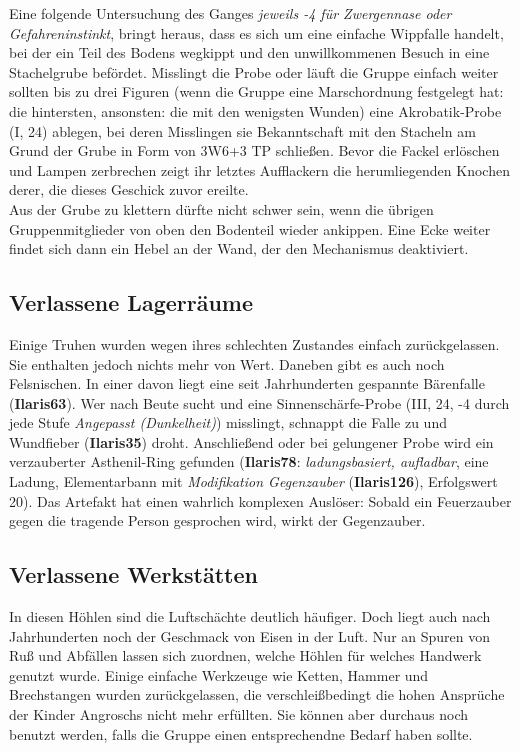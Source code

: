 \documentclass[openright]{Ilaris}
\begin{document}
Eine folgende Untersuchung des Ganges
{\emph{jeweils -4 für Zwergennase oder Gefahreninstinkt}, bringt heraus, dass es sich um eine einfache Wippfalle handelt, bei der ein Teil des Bodens wegkippt und den unwillkommenen Besuch in eine Stachelgrube befördet.}
Misslingt die Probe oder läuft die Gruppe einfach weiter sollten bis zu drei Figuren (wenn die Gruppe eine Marschordnung festgelegt hat: die hintersten, ansonsten: die mit den wenigsten Wunden) eine Akrobatik-Probe (I, 24) ablegen, bei deren Misslingen sie Bekanntschaft mit den Stacheln am Grund der Grube in Form von 3W6+3 TP schließen.
Bevor die Fackel erlöschen und Lampen zerbrechen zeigt ihr letztes Aufflackern die herumliegenden Knochen derer, die dieses Geschick zuvor ereilte.\\
Aus der Grube zu klettern dürfte nicht schwer sein, wenn die übrigen Gruppenmitglieder von oben den Bodenteil wieder ankippen.
Eine Ecke weiter findet sich dann ein Hebel an der Wand, der den Mechanismus deaktiviert.


\subsection{Verlassene Lagerräume}
Einige Truhen wurden wegen ihres schlechten Zustandes einfach zurückgelassen. 
Sie enthalten jedoch nichts mehr von Wert.
Daneben gibt es auch noch Felsnischen.
In einer davon liegt eine seit Jahrhunderten gespannte Bärenfalle (\textbf{Ilaris63}).
Wer nach Beute sucht und eine Sinnenschärfe-Probe (III, 24, -4 durch jede Stufe \emph{Angepasst (Dunkelheit)}) misslingt, schnappt die Falle zu und Wundfieber (\textbf{Ilaris35}) droht.
Anschließend oder bei gelungener Probe wird ein verzauberter Asthenil-Ring gefunden (\textbf{Ilaris78}: \emph{ladungsbasiert, aufladbar}, eine Ladung, Elementarbann mit \emph{Modifikation Gegenzauber} (\textbf{Ilaris126}), Erfolgswert 20).
Das Artefakt hat einen wahrlich komplexen Auslöser: Sobald ein Feuerzauber gegen die tragende Person gesprochen wird, wirkt der Gegenzauber.

\subsection{Verlassene Werkstätten}
In diesen Höhlen sind die Luftschächte deutlich häufiger. Doch liegt auch nach Jahrhunderten noch der Geschmack von Eisen in der Luft.
Nur an Spuren von Ruß und Abfällen lassen sich zuordnen, welche Höhlen für welches Handwerk genutzt wurde.
Einige einfache Werkzeuge wie Ketten, Hammer und Brechstangen wurden zurückgelassen, die verschleißbedingt die hohen Ansprüche der Kinder Angroschs nicht mehr erfüllten. Sie können aber durchaus noch benutzt werden, falls die Gruppe einen entsprechendne Bedarf haben sollte.
\end{document}
